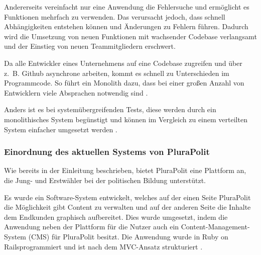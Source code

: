 Andererseits vereinfacht nur eine Anwendung die Fehlersuche und ermöglicht es Funktionen mehrfach zu verwenden. Das verursacht jedoch, dass schnell Abhängigkeiten entstehen können und Änderungen zu Fehlern führen. Dadurch wird die Umsetzung von neuen Funktionen mit wachsender Codebase verlangsamt und der Einstieg von neuen Teammitgliedern erschwert.

Da alle Entwickler eines Unternehmens auf eine Codebase zugreifen und über z.~B. Github asynchrone arbeiten, kommt es schnell zu Unterschieden im Programmcode. So führt ein Monolith dazu, dass bei einer großen Anzahl von Entwicklern viele Absprachen notwendig sind \parencite[vgl.][Kap. 2.2.4]{newman_monolith_2019}.

Anders ist es bei systemübergreifenden Tests, diese werden durch ein monolithisches System begünstigt und können im Vergleich zu einem verteilten System einfacher umgesetzt werden  \parencite[vgl.][Kap. 2.2.5]{newman_monolith_2019}.

\subsubsection{Einordnung des aktuellen Systems von PluraPolit}
\label{sec:einordnung}

Wie bereits in der Einleitung beschrieben, bietet PluraPolit eine Plattform an, die Jung- und Erstwähler bei der politischen Bildung unterstützt.

Es wurde ein Software-System entwickelt, welches auf der einen Seite PluraPolit die Möglichkeit gibt Content zu verwalten und auf der anderen Seite die Inhalte dem Endkunden graphisch aufbereitet. Dies wurde umgesetzt, indem die Anwendung neben der Plattform für die Nutzer auch ein Content-Management-System (CMS) für PluraPolit besitzt. Die Anwendung wurde in Ruby on Rails\footnotemark programmiert und ist nach dem MVC-Ansatz strukturiert \parencites[vgl.][S. 66 ff.]{hartl_ruby_2016}.


